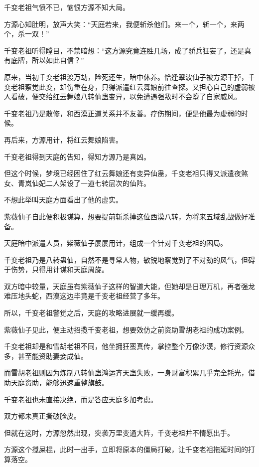 
\begin{this_body}

千变老祖气愤不已，恼恨方源不知大局。

方源心知肚明，放声大笑：“天庭若来，我便斩杀他们。来一个，斩一个，来两个，杀一双！”

千变老祖听得瞠目，不禁暗想：“这方源究竟连胜几场，成了骄兵狂妄了，还是真有底牌，所以如此自信？”

原来，当初千变老祖渡万劫，险死还生，暗中休养。恰逢翠波仙子被方源干掉，千变老祖察觉此变，却伤重在身，只得派遣红云舞娘前往查探。又担心自己的虚弱被人看破，便交给红云舞娘八转仙蛊变异，以免遭遇强敌时不会堕了自家威风。

千变老祖乃是散修，和西漠正道关系并不友善。疗伤期间，便是他最为虚弱的时候。

再后来，方源用计，将红云舞娘陷害。

千变老祖得到天庭的告知，得知方源乃是真凶。

但这个时候，梦境已经困住了红云舞娘还有变异仙蛊，千变老祖只得又派遣夜煞女、青岚仙妃二人架设了一道七转层次的仙阵。

不想此举叫天庭方面看出了他的虚实。

紫薇仙子自此便积极谋算，想要提前斩杀掉这位西漠八转，为将来五域乱战做好准备。

天庭暗中派遣人员，紫薇仙子屡屡用计，组成一个针对千变老祖的困局。

千变老祖乃是八转蛊仙，自然不是寻常人物，敏锐地察觉到了不对劲的风气，但碍于伤势，只得用计谋和天庭周旋。

双方暗中较量，天庭虽有紫薇仙子这样的智道大能，但她却是日理万机，再者强龙难压地头蛇，西漠这边毕竟是千变老祖经营了多年。

所以，千变老祖警觉之后，天庭的攻略进展就一缓再缓。

紫薇仙子见此，便主动招揽千变老祖，想要效仿之前资助雪胡老祖的成功案例。

千变老祖却是和雪胡老祖不同，他坐拥狂蛮真传，掌控整个万像沙漠，修行资源众多，甚至能资助妻妾成仙。

而雪胡老祖则因为炼制八转仙蛊鸿运齐天蛊失败，一身财富积累几乎完全耗光，借助天庭资助，能够迅速重整旗鼓。

千变老祖也未直接决绝，而是答应天庭多加考虑。

双方都未真正撕破脸皮。

但就在这时，方源忽然出现，突袭万里变通大阵，千变老祖并不情愿出手。

方源这个搅屎棍，此时一出手，立即将原本的僵局打破，让千变老祖拖延时间的打算落空。


\end{this_body}
